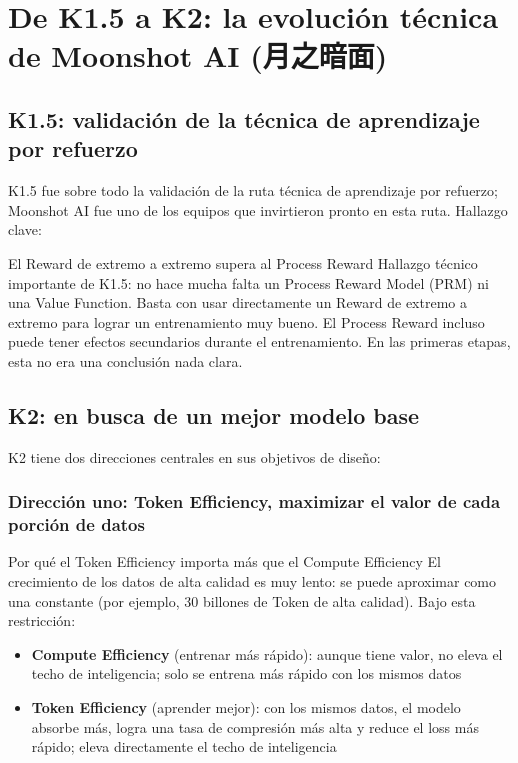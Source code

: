 \section{De K1.5 a K2: la evolución técnica de Moonshot AI (月之暗面)}

\subsection{K1.5: validación de la técnica de aprendizaje por refuerzo}

K1.5 fue sobre todo la validación de la ruta técnica de aprendizaje por refuerzo; Moonshot AI fue uno de los equipos que invirtieron pronto en esta ruta. Hallazgo clave:

\begin{importantbox}{El Reward de extremo a extremo supera al Process Reward}
Hallazgo técnico importante de K1.5: no hace mucha falta un Process Reward Model (PRM) ni una Value Function. Basta con usar directamente un Reward de extremo a extremo para lograr un entrenamiento muy bueno. El Process Reward incluso puede tener efectos secundarios durante el entrenamiento. En las primeras etapas, esta no era una conclusión nada clara.
\end{importantbox}

\subsection{K2: en busca de un mejor modelo base}

K2 tiene dos direcciones centrales en sus objetivos de diseño:

\subsubsection{Dirección uno: Token Efficiency, maximizar el valor de cada porción de datos}

\begin{importantbox}{Por qué el Token Efficiency importa más que el Compute Efficiency}
El crecimiento de los datos de alta calidad es muy lento: se puede aproximar como una constante (por ejemplo, 30 billones de Token de alta calidad). Bajo esta restricción:
\begin{itemize}
    \item \textbf{Compute Efficiency} (entrenar más rápido): aunque tiene valor, no eleva el techo de inteligencia; solo se entrena más rápido con los mismos datos
    \item \textbf{Token Efficiency} (aprender mejor): con los mismos datos, el modelo absorbe más, logra una tasa de compresión más alta y reduce el loss más rápido; eleva directamente el techo de inteligencia
\end{itemize}
\end{importantbox}

